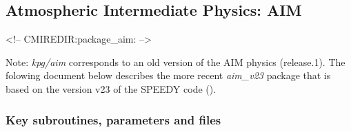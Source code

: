 \subsection{Atmospheric Intermediate Physics: AIM}
\label{sec:pkg:aim}
\begin{rawhtml}
<!-- CMIREDIR:package_aim: -->
\end{rawhtml}

Note:
 {\it kpg/aim} corresponds to an old version of the AIM physics (release.1).
 The folowing document below describes the more recent {\it aim\_v23} package
 that is based on the version v23 of the SPEEDY code (\cite{molteni:03}).

\subsubsection{Key subroutines, parameters and files}
\label{sec:pkg:aim:implementation}
